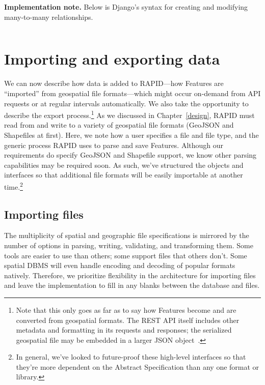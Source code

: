 \textbf{Implementation note.} Below is Django's syntax for creating and modifying many-to-many relationships.


\begin{Verbatim}[samepage=true,baselinestretch=1,numbers=left,xleftmargin=12mm]

\end{Verbatim}

\section{Importing and exporting data}
We can now describe how data is added to RAPID---how Features are ``imported'' from geospatial file formats---which might occur on-demand from API requests or at regular intervals automatically. We also take the opportunity to describe the export process.\footnote{Note that this only goes as far as to say how Features become and are converted from geospatial formats. The REST API itself includes other metadata and formatting in its requests and responses; the serialized geospatial file may be embedded in a larger JSON object~\cite{Francis}.} As we discussed in Chapter~\ref{design}, RAPID must read from and write to a variety of geospatial file formats (GeoJSON and Shapefiles at first). Here, we note how a user specifies a file and file type, and the generic process RAPID uses to parse and save Features. Although our requirements do specify GeoJSON and Shapefile support, we know other parsing capabilities may be required soon. As such, we've structured the objects and interfaces so that additional file formats will be easily importable at another time.\footnote{In general, we've looked to future-proof these high-level interfaces so that they're more dependent on the Abstract Specification than any one format or library.}

\subsection{Importing files}
The multiplicity of spatial and geographic file specifications is mirrored by the number of options in parsing, writing, validating, and transforming them. Some tools are easier to use than others; some support files that others don't. Some spatial DBMS will even handle encoding and decoding of popular formats natively. Therefore, we prioritize flexibility in the architecture for importing files and leave the implementation to fill in any blanks between the database and files.

